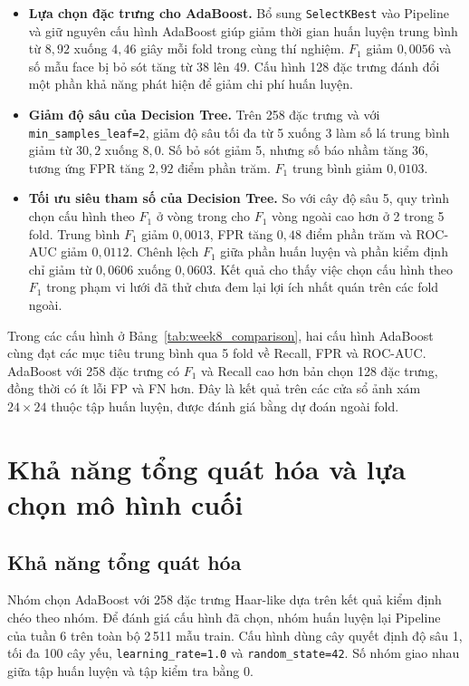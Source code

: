 \documentclass[12pt,a4paper,oneside]{report}
\begin{document}
\begin{itemize}
  \item \textbf{Lựa chọn đặc trưng cho AdaBoost.}
    Bổ sung \texttt{SelectKBest} vào Pipeline và giữ nguyên cấu hình
    AdaBoost giúp giảm thời gian huấn luyện trung bình từ $8{,}92$
    xuống $4{,}46$ giây mỗi fold trong cùng thí nghiệm.
    $F_1$ giảm $0{,}0056$ và số mẫu face bị bỏ sót tăng từ 38 lên 49.
    Cấu hình 128 đặc trưng đánh đổi một phần khả năng phát hiện
    để giảm chi phí huấn luyện.

  \item \textbf{Giảm độ sâu của Decision Tree.}
    Trên 258 đặc trưng và với \texttt{min\_samples\_leaf=2},
    giảm độ sâu tối đa từ 5 xuống 3 làm số lá trung bình giảm từ
    $30{,}2$ xuống $8{,}0$. Số bỏ sót giảm 5, nhưng số báo nhầm
    tăng 36, tương ứng FPR tăng $2{,}92$ điểm phần trăm.
    $F_1$ trung bình giảm $0{,}0103$.

  \item \textbf{Tối ưu siêu tham số của Decision Tree.}
    So với cây độ sâu 5, quy trình chọn cấu hình theo $F_1$
    ở vòng trong cho $F_1$ vòng ngoài cao hơn ở 2 trong 5 fold.
    Trung bình $F_1$ giảm $0{,}0013$, FPR tăng $0{,}48$ điểm phần trăm
    và ROC-AUC giảm $0{,}0112$. Chênh lệch $F_1$ giữa phần huấn luyện
    và phần kiểm định chỉ giảm từ $0{,}0606$ xuống $0{,}0603$.
    Kết quả cho thấy việc chọn cấu hình theo $F_1$ trong phạm vi
    lưới đã thử chưa đem lại lợi ích nhất quán trên các fold ngoài.
\end{itemize}

Trong các cấu hình ở Bảng~\ref{tab:week8_comparison},
hai cấu hình AdaBoost cùng đạt các mục tiêu trung bình qua 5 fold
về Recall, FPR và ROC-AUC. AdaBoost với 258 đặc trưng có $F_1$
và Recall cao hơn bản chọn 128 đặc trưng, đồng thời có ít lỗi FP
và FN hơn. Đây là kết quả trên các cửa sổ ảnh xám $24 \times 24$
thuộc tập huấn luyện, được đánh giá bằng dự đoán ngoài fold.

\section{Khả năng tổng quát hóa và lựa chọn mô hình cuối}

\subsection{Khả năng tổng quát hóa}
\label{subsec:week8_generalization}

Nhóm chọn AdaBoost với 258 đặc trưng Haar-like dựa trên kết quả
kiểm định chéo theo nhóm. Để đánh giá cấu hình đã chọn, nhóm
huấn luyện lại Pipeline của tuần 6 trên toàn bộ 2\,511 mẫu train.
Cấu hình dùng cây quyết định độ sâu 1, tối đa 100 cây yếu,
\texttt{learning\_rate=1.0} và \texttt{random\_state=42}.
Số nhóm giao nhau giữa tập huấn luyện và tập kiểm tra bằng 0.
\end{document}
